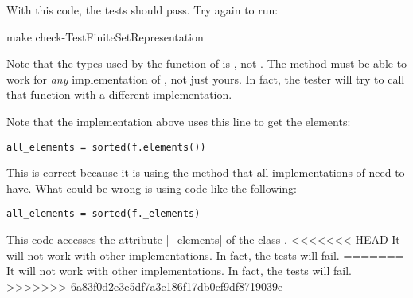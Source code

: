 \begin{longcode}
  \caption{}
  \label{lst:act4e_book_examples.f2}
\end{longcode}

With this code, the tests should pass. Try again to run:

\begin{console}
  make check-TestFiniteSetRepresentation
\end{console}

Note that the types used by the function  of  is \FiniteSet,
not . The method must be able to work for \emph{any} implementation of  \FiniteSet,
not just yours. In fact, the tester will try to call that function with a different implementation.

Note that the implementation above uses this line to get the elements:

\begin{verbatim}
all_elements = sorted(f.elements())
\end{verbatim}

This is correct because it is using the method  that all implementations of  \FiniteSet
need to have. What could be wrong is using code like the following:

\begin{verbatim}
all_elements = sorted(f._elements)
\end{verbatim}

This code accesses the attribute \pystr|_elements| of the class .
<<<<<<< HEAD
It will not work with other implementations. In fact, the tests will fail.
=======
It will not work with other implementations. In fact, the tests will fail.
>>>>>>> 6a83f0d2e3e5df7a3e186f17db0cf9df8719039e

